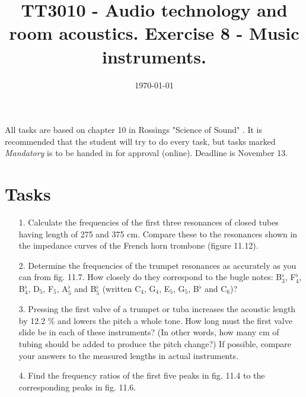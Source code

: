 \documentclass{article}
\title{TT3010 - Audio technology and room acoustics. \newline Exercise 8 - Music instruments.}
\date{\today}
\begin{document}
\maketitle

All tasks are based on chapter 10 in Rossings "Science of Sound" \cite{rossing}. 
It is recommended that the student will try to do every task, but tasks marked \textit{Mandatory} is to be handed in for approval (online). Deadline is November 13.

\section*{Tasks}
\begin{itemize}
    
    \item[1.] Calculate the frequencies of the first three resonances of closed tubes having length of 275 and 375 cm. Compare these to the resonances shown in the impedance curves of the French horn trombone (figure 11.12).
    
    \item[2.] Determine the frequencies of the trumpet resonances as accurately as you can from fig. 11.7. How closely do they correspond to the bugle notes: B$^\flat_3$, F$^\flat_4$, B$^\flat_4$, D$_5$, F$_5$, A$^\flat_5$ and B$^\flat_5$ (written C$_4$, G$_4$, E$_5$, G$_5$, B$^\flat$ and C$_6$)?

    \item[3.] Pressing the first valve of a trumpet or tuba increases the acoustic length by 12.2 \% and lowers the pitch a whole tone. How long must the first valve slide be in each of these instruments? (In other words, how many cm of tubing should be added to produce the pitch change?) If possible, compare your answers to the measured lengths in actual instruments.
    
    \item[4.] Find the frequency ratios of the first five peaks in fig. 11.4 to the corresponding peaks in fig. 11.6.
    
    
    

\end{itemize}

\end{document}
